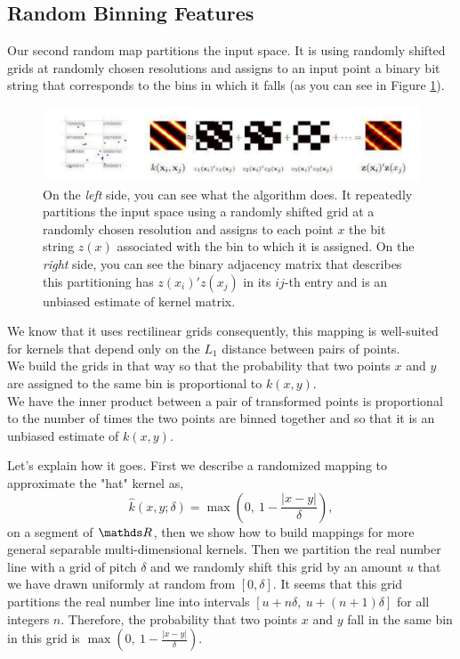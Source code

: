 \documentclass{article}
\begin{document}
\subsection{Random Binning Features}
Our second random map partitions the input space. It is using randomly shifted grids at randomly chosen resolutions and assigns to an input point a binary bit string that corresponds to the bins in which it falls (as you can see in Figure \ref{Random_shift_grids}).
\begin{figure}[h!]
    \centering
    \includegraphics[scale=0.7]{images/Radom_binning_features.pdf}
    \caption{On the \textit{left} side, you can see what the algorithm does. It repeatedly partitions the input space using a randomly shifted grid at a randomly chosen resolution and assigns to each point $x$ the bit string $z(x)$ associated with the bin to which it is assigned. On the \textit{right} side, you can see the binary adjacency matrix that describes this partitioning has $z(x_i)'z(x_j)$ in its $ij$-th entry and is an unbiased estimate of kernel matrix.}
    \label{Random_shift_grids}
\end{figure}

We know that it uses rectilinear grids consequently, this mapping is well-suited for kernels that depend only on the $L_1$ distance between pairs of points.\\
We build the grids in that way so that the probability that two points $x$ and $y$ are assigned to the same bin is proportional to $k(x,y)$. \\
We have the inner product between a pair of transformed points is proportional to the number of times the two points are binned together and so that it is an unbiased estimate of $k(x,y)$.

\newpage
Let's explain how it goes. First we describe a randomized mapping to approximate the "hat" kernel as, 
\begin{equation*}
    \hat{k}(x,y; \delta) = \max \left(0,\ 1-\frac{|x-y|}{\delta} \right),
\end{equation*}
on a segment of $\bbR$, then we show how to build mappings for more general separable multi-dimensional kernels. Then we partition the real number line with a grid of pitch $\delta$ and we randomly shift this grid by an amount $u$ that we have drawn uniformly at random from $[0, \delta]$. It seems that this grid partitions the real number line into intervals $[u + n\delta, \ u + (n+1) \delta]$ for all integers $n$. Therefore, the probability that two points $x$ and $y$ fall in the same bin in this grid is $\max \left(0, \ 1-\frac{|x-y|}{\delta} \right)$.\\
\end{document}
